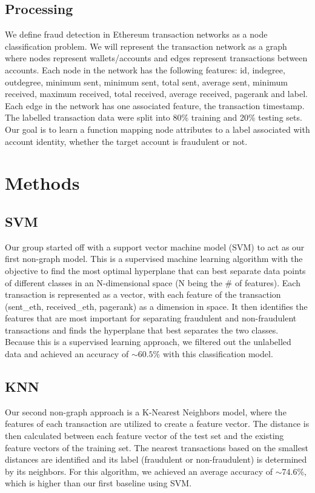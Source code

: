 \documentclass{article}
\begin{document}
\subsection{Processing}
We define fraud detection in Ethereum transaction networks as a node classification problem. We will represent the transaction network as a graph where nodes represent wallets/accounts and edges represent transactions between accounts. Each node in the network has the following features: id, indegree, outdegree, minimum sent, minimum sent, total sent, average sent, minimum received, maximum received, total received, average received, pagerank and label. Each edge in the network has one associated feature, the transaction timestamp. The labelled transaction data were split into 80\% training and 20\% testing sets. Our goal is to learn a function mapping node attributes to a label associated with account identity, whether the target account is fraudulent or not.


\section{Methods}

\subsection{SVM}
    Our group started off with a support vector machine model (SVM) to act as our first non-graph model. This is a supervised machine learning algorithm with the objective to find the most optimal hyperplane that can best separate data points of different classes in an N-dimensional space (N being the \# of features). Each transaction is represented as a vector, with each feature of the transaction (sent\_eth, received\_eth, pagerank) as a dimension in space. It then identifies the features that are most important for separating fraudulent and non-fraudulent transactions and finds the hyperplane that best separates the two classes. Because this is a supervised learning approach, we filtered out the unlabelled data and achieved an accuracy of $\sim$$60.5\%$ with this classification model. 


\subsection{KNN}
        Our second non-graph approach is a K-Nearest Neighbors model, where the features of each transaction are utilized to create a feature vector. The distance is then calculated between each feature vector of the test set and the existing feature vectors of the training set. The nearest transactions based on the smallest distances are identified and its label (fraudulent or non-fraudulent) is determined by its neighbors. For this algorithm, we achieved an average accuracy of $\sim$$74.6\%$, which is higher than our first baseline using SVM. 
\end{document}
